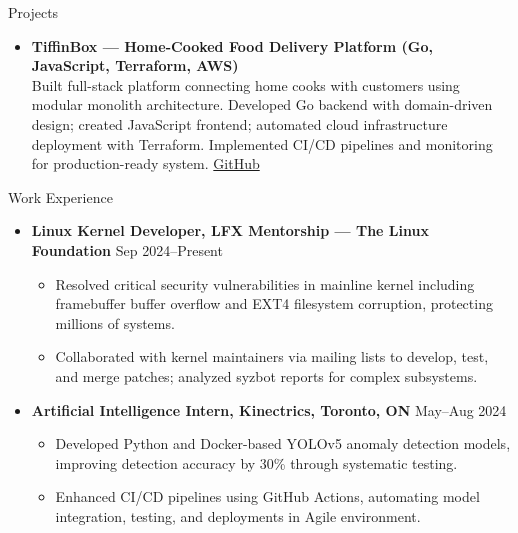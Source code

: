 \documentclass{resume} %
\begin{document}
\begin{rSection}{Projects}
\begin{itemize}[left=0pt,itemsep=2pt]
  \item \textbf{TiffinBox — Home-Cooked Food Delivery Platform (Go, JavaScript, Terraform, AWS)}\\
        Built full-stack platform connecting home cooks with customers using modular monolith architecture. Developed Go backend with domain-driven design; created JavaScript frontend; automated cloud infrastructure deployment with Terraform. Implemented CI/CD pipelines and monitoring for production-ready system. \href{https://github.com/orgs/Appster-Capstone-Project/repositories}{GitHub}
\end{itemize}
\end{rSection}

\begin{rSection}{Work Experience}
\begin{itemize}[left=0pt,itemsep=0pt]
  \item \textbf{Linux Kernel Developer, LFX Mentorship — The Linux Foundation} \hfill Sep 2024–Present
        \begin{itemize}[nosep,itemsep=0pt,leftmargin=1em]
            \item Resolved critical security vulnerabilities in mainline kernel including framebuffer buffer overflow and EXT4 filesystem corruption, protecting millions of systems.
            \item Collaborated with kernel maintainers via mailing lists to develop, test, and merge patches; analyzed syzbot reports for complex subsystems.
        \end{itemize}
  \item \textbf{Artificial Intelligence Intern, Kinectrics, Toronto, ON} \hfill May–Aug 2024
        \begin{itemize}[nosep,itemsep=0pt,leftmargin=1em]
            \item Developed Python and Docker-based YOLOv5 anomaly detection models, improving detection accuracy by 30\% through systematic testing.
            \item Enhanced CI/CD pipelines using GitHub Actions, automating model integration, testing, and deployments in Agile environment.
        \end{itemize}
\end{itemize}
\end{rSection}
\end{document}
